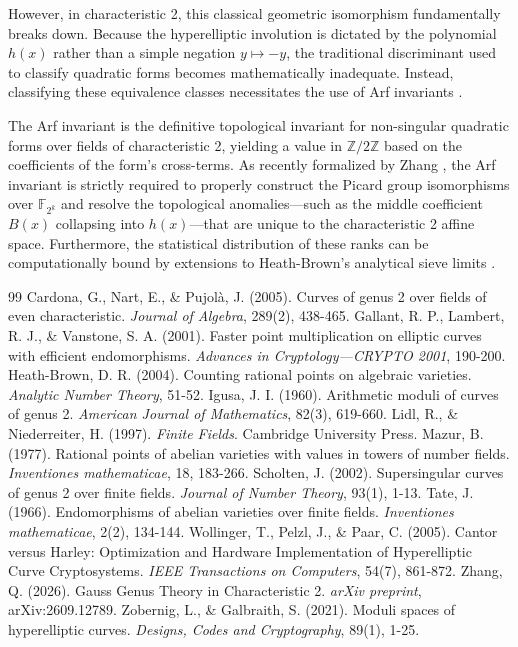 \documentclass[11pt,letterpaper]{article}
\begin{document}
	However, in characteristic 2, this classical geometric isomorphism fundamentally breaks down. Because the hyperelliptic involution is dictated by the polynomial $h(x)$ rather than a simple negation $y \mapsto -y$, the traditional discriminant used to classify quadratic forms becomes mathematically inadequate. Instead, classifying these equivalence classes necessitates the use of Arf invariants \cite{Lidl1997}. 
	
	The Arf invariant is the definitive topological invariant for non-singular quadratic forms over fields of characteristic 2, yielding a value in $\mathbb{Z}/2\mathbb{Z}$ based on the coefficients of the form's cross-terms. As recently formalized by Zhang \cite{Zhang2026}, the Arf invariant is strictly required to properly construct the Picard group isomorphisms over $\mathbb{F}_{2^k}$ and resolve the topological anomalies---such as the middle coefficient $B(x)$ collapsing into $h(x)$---that are unique to the characteristic 2 affine space. Furthermore, the statistical distribution of these ranks can be computationally bound by extensions to Heath-Brown's analytical sieve limits \cite{HeathBrown2004}.
	
	\begin{thebibliography}{99}
		 Cardona, G., Nart, E., \& Pujolà, J. (2005). Curves of genus 2 over fields of even characteristic. \textit{Journal of Algebra}, 289(2), 438-465.
		 Gallant, R. P., Lambert, R. J., \& Vanstone, S. A. (2001). Faster point multiplication on elliptic curves with efficient endomorphisms. \textit{Advances in Cryptology—CRYPTO 2001}, 190-200.
		 Heath-Brown, D. R. (2004). Counting rational points on algebraic varieties. \textit{Analytic Number Theory}, 51-52.
		 Igusa, J. I. (1960). Arithmetic moduli of curves of genus 2. \textit{American Journal of Mathematics}, 82(3), 619-660.
		 Lidl, R., \& Niederreiter, H. (1997). \textit{Finite Fields}. Cambridge University Press.
		 Mazur, B. (1977). Rational points of abelian varieties with values in towers of number fields. \textit{Inventiones mathematicae}, 18, 183-266.
		 Scholten, J. (2002). Supersingular curves of genus 2 over finite fields. \textit{Journal of Number Theory}, 93(1), 1-13.
		 Tate, J. (1966). Endomorphisms of abelian varieties over finite fields. \textit{Inventiones mathematicae}, 2(2), 134-144.
		 Wollinger, T., Pelzl, J., \& Paar, C. (2005). Cantor versus Harley: Optimization and Hardware Implementation of Hyperelliptic Curve Cryptosystems. \textit{IEEE Transactions on Computers}, 54(7), 861-872.
		 Zhang, Q. (2026). Gauss Genus Theory in Characteristic 2. \textit{arXiv preprint}, arXiv:2609.12789.
		 Zobernig, L., \& Galbraith, S. (2021). Moduli spaces of hyperelliptic curves. \textit{Designs, Codes and Cryptography}, 89(1), 1-25.
	\end{thebibliography}
	
\end{document}
